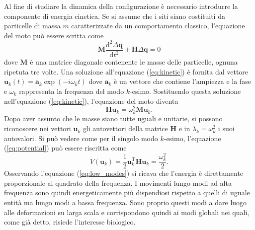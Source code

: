 Al fine di studiare la dinamica della configurazione è necessario introdurre la componente di energia cinetica. Se si assume che i siti siano costituiti da particelle di massa $ m $ caratterizzate da un comportamento classico, l'equazione del moto può essere scritta come 
\begin{equation} \label{eq:kinetic}
	\mathbf{M} \frac{\mathrm{d^2} \Delta \mathbf{q}}{\mathrm{d}t^2} +  \mathbf{H} \Delta \mathbf{q} = 0
\end{equation}
dove $ \mathbf{M} $ è una matrice diagonale contenente le masse delle particelle, ognuna ripetuta tre volte. Una soluzione all'equazione (\ref{eq:kinetic}) è fornita dal vettore $ \mathbf{u}_k(t) =  \mathbf{a}_k \exp (-i \omega_k t)$ dove $ \mathbf{a}_k $ è un vettore che contiene l'ampiezza e la fase e $ \omega_k $ rappresenta la frequenza del modo $ k $-esimo. Sostituendo questa soluzione nell'equazione (\ref{eq:kinetic}), l'equazione del moto diventa 
\begin{equation}
	\mathbf{H} \mathbf{u}_k = \omega_{k}^{2} \mathbf{M} \mathbf{u}_k.
\end{equation}
Dopo aver assunto che le masse siano tutte uguali e unitarie, si possono riconoscere nei vettori $ \mathbf{u}_k $ gli autovettori della matrice $ \mathbf{H} $ e in $ \lambda_{k} = \omega_{k}^{2} $ i suoi autovalori.
Si può vedere come per il singolo modo $ k $-esimo, l'equazione (\ref{eq:potential}) può essere riscritta come 
\begin{equation}\label{eq:low_modes}
	V(\mathbf{u}_k) = \frac{1}{2} \mathbf{u}_{k}^{\mathrm{T}} \mathbf{H} \mathbf{u}_{k} = \frac{ \omega_{k}^2}{2}.
\end{equation}
Osservando l'equazione (\ref{eq:low_modes}) si ricava che l'energia è direttamente proporzionale al quadrato della frequenza. I movimenti lungo modi ad alta frequenza sono quindi energeticamente più dispendiosi rispetto a quelli di uguale entità ma lungo modi a bassa frequenza.
Sono proprio questi modi a dare luogo alle deformazioni su larga scala e corrispondono quindi ai modi globali nei quali, come già detto, risiede l'interesse biologico.

